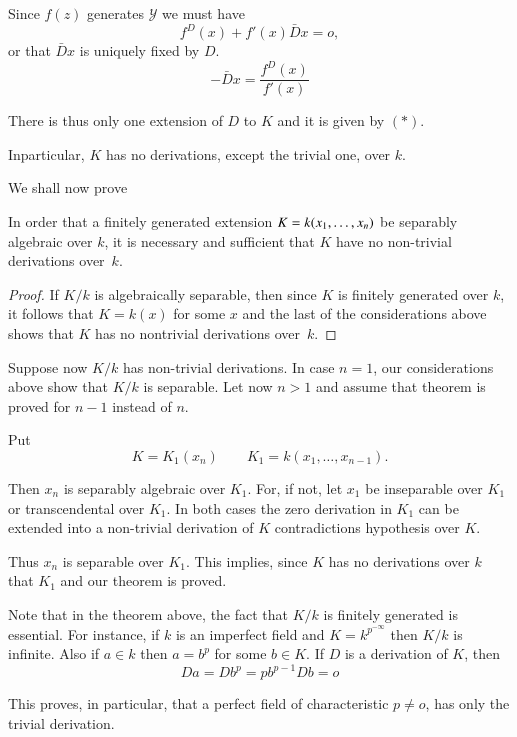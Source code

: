 Since $f(z)$ generates $\mathscr{Y}$ we must have 
$$
f^D(x)+f'(x) \bar{D} x = o,
$$
or that $\bar{D}x$ is uniquely fixed by $D$. 
\begin{equation*}
-\bar{D}x = \frac{f^D(x)}{f'(x)} \tag{*}
\end{equation*}

There is thus only one extension of $D$ to $K$ and it is given by $(*)$.

In\pageoriginale particular, $K$ has no derivations, except the
trivial one, over $k$. 

We shall now prove 
 
\begin{thm}\label{c3:thm7}%
In order that a finitely generated extension $K =k (x_1 ,\break \ldots,
  x_n)$ be separably algebraic over $k$, it is necessary and
  sufficient that $K$ have no non-trivial derivations over~$k$. 
\end{thm}

\begin{proof}
If $K/k$ is algebraically separable, then since $K$ is finitely
generated over $k$, it follows that $K= k(x)$ for some $x$ and the
last of the considerations above shows that $K$ has no nontrivial
derivations over~$k$. 
\end{proof}

Suppose now $K/k$ has non-trivial derivations. In case $n=1$, our
considerations above show that $K/k$ is separable. Let now $n>1$ and
assume that theorem is proved for $n-1$ instead of $n$. 

Put
$$
K=K_1(x_n) \qquad K_1 = k(x_1, \ldots, x_{n-1}). 
$$

Then $x_n$ is separably algebraic over $K_1$. For, if not, let $x_1$ be
inseparable over  $K_1$ or transcendental over $K_1$. In both cases
the zero derivation in $K_1$ can be extended into a non-trivial
derivation of $K$ contradictions hypothesis over $K$. 

Thus $x_n$ is separable over $K_1$. This implies, since $K$ has no
derivations over $k$ that $K_1$ and our theorem is proved. 

Note that in the theorem above, the fact that $K/k$ is finitely
generated is essential. For instance, if $k$ is an imperfect field and
$K=k^{p^{-\infty}}$ then $K/k$ is infinite. Also if $a \in k$ then
\pageoriginale $a=b^p$ for some $b \in K$. If $D$ is a derivation of $K$, then  
$$
D a = Db^p = p b^{p-1}Db = o
$$

This proves, in particular, that a perfect field of characteristic $p
\neq o$, has only the trivial derivation. 

